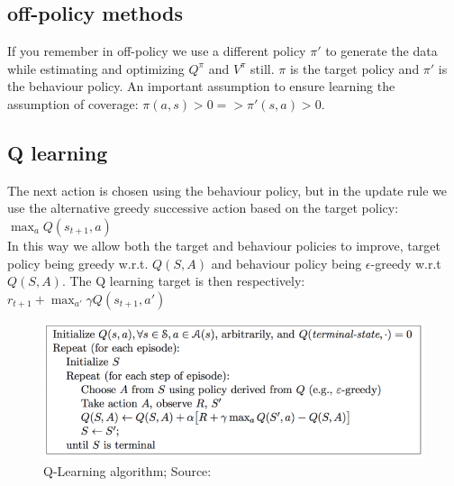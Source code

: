 
\subsection{off-policy methods}

If you remember in off-policy we use a different policy $\pi'$ to generate the data while estimating and optimizing $Q^{\pi}$ and $V^{\pi}$ still. $\pi$ is the target policy and $\pi'$ is the  behaviour policy. An important assumption to ensure learning the assumption of coverage: $\pi(a, s) > 0 => \pi'(s, a) > 0$.\\


\subsection{Q learning}
The  next action is chosen using the behaviour policy, but in the update rule we use the alternative greedy successive action based on the target policy: $\max_a Q(s_{t+1}, a)$\\

In this way we allow both the target and behaviour policies to improve, target policy being greedy w.r.t. $Q(S, A)$ and behaviour policy being $\epsilon$-greedy w.r.t $Q(S, A)$. The Q learning target is then respectively: $r_{t+1} + \max_{a'} \gamma Q(s_{t+1}, a')$\\

\begin{figure}[h!]
  \centering
  \includegraphics[scale=0.5]{figures/q_learning.PNG}
  \caption{Q-Learning algorithm; Source: \cite{lecture_mfc}}
  \label{fig:q_learning}
\end{figure}

